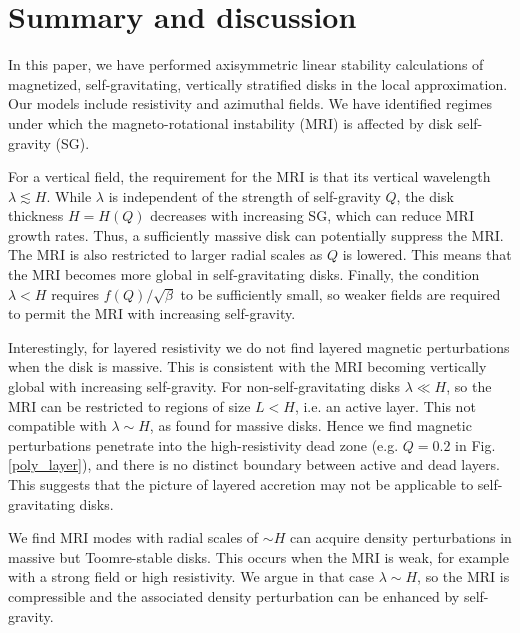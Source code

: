 \section{Summary and discussion}\label{summary}
In this paper, we have performed axisymmetric linear stability
calculations of magnetized, self-gravitating, vertically stratified
disks in the local approximation. Our models include resistivity and
azimuthal fields. We have identified regimes under which the
magneto-rotational instability (MRI) is affected by disk self-gravity
(SG).   


For a vertical field, the requirement for the MRI is that   
its vertical wavelength $\lambda \lesssim H$. While $\lambda$ is independent of
the strength of self-gravity $Q$, the disk thickness $H=H(Q)$ 
decreases with increasing SG, which can reduce MRI growth rates. 
Thus, a sufficiently massive disk can potentially suppress the MRI. 
The MRI is also restricted to larger radial
scales as $Q$ is lowered. This means that the MRI becomes more global
in self-gravitating disks. Finally, the condition $\lambda < H$ 
requires $f(Q)/\sqrt{\beta}$ to be sufficiently small, so weaker
fields are required to permit the MRI with increasing self-gravity.   
 
Interestingly, for layered resistivity we do not find layered
magnetic perturbations when the disk is massive. This is 
consistent with the MRI becoming vertically global with increasing self-gravity.    
For non-self-gravitating disks $\lambda\ll H$, so the MRI can be
restricted to regions of size $L<H$, i.e. an active layer. This not
compatible with $\lambda \sim H$, as found for massive disks. Hence we
find magnetic perturbations penetrate into the high-resistivity dead
zone (e.g. $Q=0.2$ in Fig. \ref{poly_layer}), and there is no distinct
boundary between active and dead layers. This suggests that the
picture of layered accretion  \citep[e.g.][]{fleming03} may not be applicable 
to self-gravitating disks.  

We find MRI modes with radial scales of $\sim H$ can acquire  
density perturbations in massive but Toomre-stable disks. 
This occurs when the MRI is weak, for example with a strong field or
high resistivity. We argue in that case $\lambda\sim H$, so the MRI is
compressible and the associated density
perturbation can be enhanced by self-gravity.

